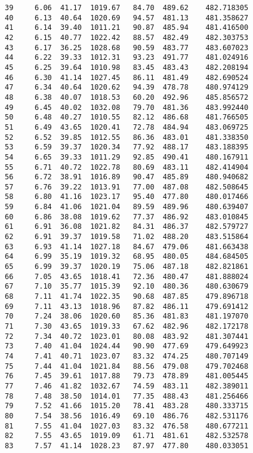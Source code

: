 \documentclass[11pt]{article}
\begin{document}
\begin{tcolorbox}[breakable, size=fbox, boxrule=.5pt, pad at break*=1mm, opacityfill=0]
\begin{Verbatim}[commandchars=\\\{\}]
39     6.06  41.17  1019.67   84.70  489.62    482.718305
40     6.13  40.64  1020.69   94.57  481.13    481.358627
41     6.14  39.40  1011.21   90.87  485.94    481.416500
42     6.15  40.77  1022.42   88.57  482.49    482.303753
43     6.17  36.25  1028.68   90.59  483.77    483.607023
44     6.22  39.33  1012.31   93.23  491.77    481.024916
45     6.25  39.64  1010.98   83.45  483.43    482.208194
46     6.30  41.14  1027.45   86.11  481.49    482.690524
47     6.34  40.64  1020.62   94.39  478.78    480.974129
48     6.38  40.07  1018.53   60.20  492.96    485.856572
49     6.45  40.02  1032.08   79.70  481.36    483.992440
50     6.48  40.27  1010.55   82.12  486.68    481.766505
51     6.49  43.65  1020.41   72.78  484.94    483.069725
52     6.52  39.85  1012.55   86.36  483.01    481.338350
53     6.59  39.37  1020.34   77.92  488.17    483.188395
54     6.65  39.33  1011.29   92.85  490.41    480.167911
55     6.71  40.72  1022.78   80.69  483.11    482.414904
56     6.72  38.91  1016.89   90.47  485.89    480.940682
57     6.76  39.22  1013.91   77.00  487.08    482.508645
58     6.80  41.16  1023.17   95.40  477.80    480.017466
59     6.84  41.06  1021.04   89.59  489.96    480.639407
60     6.86  38.08  1019.62   77.37  486.92    483.010845
61     6.91  36.08  1021.82   84.31  486.37    482.579727
62     6.91  39.37  1019.58   71.02  488.20    483.515864
63     6.93  41.14  1027.18   84.67  479.06    481.663438
64     6.99  35.19  1019.32   68.95  480.05    484.684505
65     6.99  39.37  1020.19   75.06  487.18    482.821861
66     7.05  43.65  1018.41   72.36  480.47    481.888024
67     7.10  35.77  1015.39   92.10  480.36    480.630679
68     7.11  41.74  1022.35   90.68  487.85    479.896718
69     7.11  43.13  1018.96   87.82  486.11    479.691412
70     7.24  38.06  1020.60   85.36  481.83    481.197070
71     7.30  43.65  1019.33   67.62  482.96    482.172178
72     7.34  40.72  1023.01   80.08  483.92    481.307441
73     7.40  41.04  1024.44   90.90  477.69    479.649923
74     7.41  40.71  1023.07   83.32  474.25    480.707149
75     7.44  41.04  1021.84   88.56  479.08    479.702468
76     7.45  39.61  1017.88   79.73  478.89    481.005445
77     7.46  41.82  1032.67   74.59  483.11    482.389011
78     7.48  38.50  1014.01   77.35  488.43    481.256466
79     7.52  41.66  1015.20   78.41  483.28    480.333715
80     7.54  38.56  1016.49   69.10  486.76    482.531176
81     7.55  41.04  1027.03   83.32  476.58    480.677211
82     7.55  43.65  1019.09   61.71  481.61    482.532578
83     7.57  41.14  1028.23   87.97  477.80    480.033051

\end{Verbatim}
\end{tcolorbox}
\end{document}
